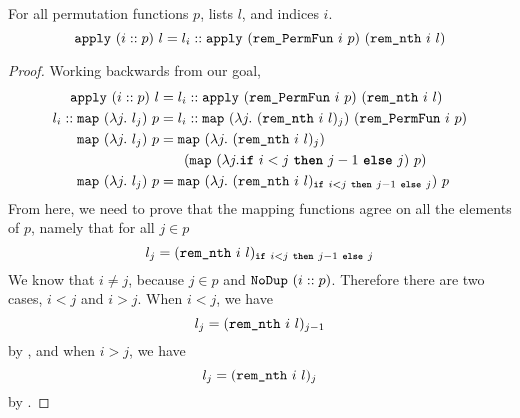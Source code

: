 \documentclass[sigplan,10pt,anonymous,review]{thesis}
\begin{document}
\begin{theorem}
  For all permutation functions $p$, lists $l$, and indices $i$.
  \begin{equation*}
    \texttt{\textup{apply}}~(i::p)~l =
    l_i :: \texttt{\textup{apply}}~(\texttt{\textup{rem\_PermFun}}~i~p)~(\texttt{\textup{rem\_nth}}~i~l)
  \end{equation*}
\end{theorem}
\begin{proof}
  Working backwards from our goal,
  \begin{align*}
    \texttt{\textup{apply}}~(i::p)~l &=
    l_i :: \texttt{\textup{apply}}~(\texttt{\textup{rem\_PermFun}}~i~p)~(\texttt{\textup{rem\_nth}}~i~l) \\
    l_i :: \texttt{\textup{map}}~(\lambda j.~l_j)~p &=
    l_i :: \texttt{\textup{map}}~(\lambda j.~(\texttt{\textup{rem\_nth}}~i~l)_j)~(\texttt{\textup{rem\_PermFun}}~i~p) \\
    \texttt{\textup{map}}~(\lambda j.~l_j)~p &=
    \texttt{\textup{map}}~(\lambda j.~(\texttt{\textup{rem\_nth}}~i~l)_j)\\
    &\phantom{=} \quad (\texttt{\textup{map}}~(\lambda j. \texttt{\textbf{if}}~i < j~\texttt{\textbf{then}}~j-1~\texttt{\textbf{else}}~j)~p) \\
    \texttt{\textup{map}}~(\lambda j.~l_j)~p &=
    \texttt{\textup{map}}~(\lambda j.~(\texttt{\textup{rem\_nth}}~i~l)_{\texttt{\textbf{if}}~i < j~\texttt{\textbf{then}}~j-1~\texttt{\textbf{else}}~j})~p \\
  \end{align*}
  From here, we need to prove that the mapping functions agree on all
  the elements of $p$, namely that for all $j \in p$
  \begin{equation*}
    l_j = (\texttt{\textup{rem\_nth}}~i~l)_{\texttt{\textbf{if}}~i < j~\texttt{\textbf{then}}~j-1~\texttt{\textbf{else}}~j}
  \end{equation*}
  We know that $i \neq j$, because $j \in p$ and $\texttt{\textup{NoDup}}~(i :: p)$.
  Therefore there are two cases, $i < j$ and $i > j$. When $i < j$, we have
  \begin{equation*}
    l_j = (\texttt{\textup{rem\_nth}}~i~l)_{j-1}
  \end{equation*}
  by , and when $i > j$, we have
  \begin{equation*}
    l_j = (\texttt{\textup{rem\_nth}}~i~l)_j
  \end{equation*}
  by .
\end{proof}
\end{document}
